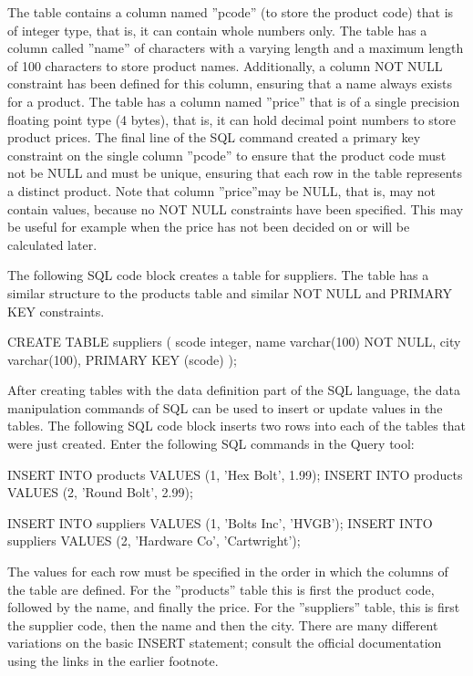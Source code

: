 The table contains a column named ''pcode'' (to store the product code) that is of integer type, that is, it can contain whole numbers only. The table has a column called ''name'' of characters with a varying length and a maximum length of 100 characters to store product names. Additionally, a column NOT NULL constraint has been defined for this column, ensuring that a name always exists for a product. The table has a column named ''price'' that is of a single precision floating point type (4 bytes), that is, it can hold decimal point numbers to store product prices. The final line of the SQL command created a primary key constraint on the single column ''pcode'' to ensure that the product code must not be NULL and must be unique, ensuring that each row in the table represents a distinct product. Note that column ''price''may be NULL, that is, may not contain values, because no NOT NULL constraints have been specified. This may be useful for example when the price has not been decided on or will be calculated later.

The following SQL code block creates a table for suppliers. The table has a similar structure to the products table and similar NOT NULL and PRIMARY KEY constraints.

\begin{samepage}
\begin{sqlcode}
CREATE TABLE suppliers (
  scode integer,
  name  varchar(100) NOT NULL,
  city  varchar(100),
  PRIMARY KEY (scode) 
);
\end{sqlcode}
\end{samepage}

After creating tables with the data definition part of the SQL language, the data manipulation commands of SQL can be used to insert or update values in the tables. The following SQL code block inserts two rows into each of the tables that were just created. Enter the following SQL commands in the Query tool:

\begin{samepage}
\begin{sqlcode}
INSERT INTO products VALUES (1, 'Hex Bolt', 1.99);
INSERT INTO products VALUES (2, 'Round Bolt', 2.99);

INSERT INTO suppliers VALUES (1, 'Bolts Inc', 'HVGB');
INSERT INTO suppliers VALUES (2, 'Hardware Co', 'Cartwright');
\end{sqlcode}
\end{samepage}

The values for each row must be specified in the order in which the columns of the table are defined. For the ''products'' table this is first the product code, followed by the name, and finally the price. For the ''suppliers'' table, this is first the supplier code, then the name and then the city. There are many different variations on the basic INSERT statement; consult the official documentation using the links in the earlier footnote.

